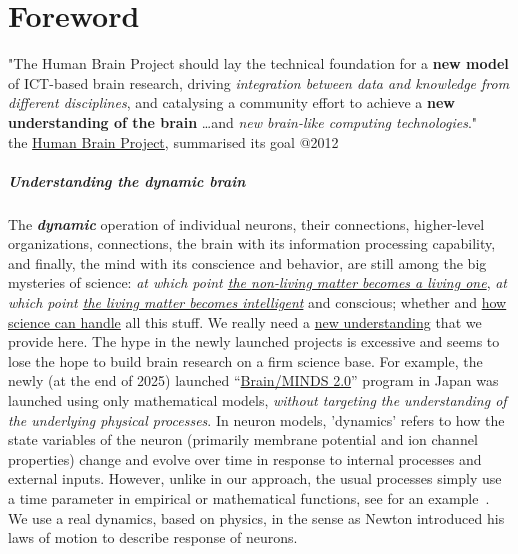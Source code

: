 
\chapter*{Foreword\label{ch:Foreword}}


\quotationbox
{"The Human Brain Project should lay the technical foundation for a \textbf{new model} of ICT-based brain research, driving \textit{integration between data and knowledge from different disciplines}, and catalysing a community effort to achieve a \textbf{new understanding of the brain}%
\dots and \textit{new brain-like computing technologies}."\\
{the \href{https://www.humanbrainproject.eu/en/}{Human Brain Project},  summarised its goal @2012}}


\paragraph*{Understanding the dynamic brain}
The \textbf{\textit{dynamic}} operation of individual neurons, their connections, higher-level organizations, connections,
the brain with its information processing capability, and finally, the mind with its conscience and behavior,
are still among the big mysteries of science: \textit{at which point
\hyperlink{LivingMatter}
{the non-living matter becomes a living one}}, \textit{at which point \hyperlink{CognitiveMatter}{the living matter becomes intelligent}} and conscious; whether and \hyperlink{PhysicalPictureNeuron}{how science can handle} all this stuff. 
We really need a \hyperlink{NewUnderstanding}
{new understanding} that we provide here.
%
The hype in the newly launched projects is excessive and seems to lose the hope 
to build brain research on a firm science base.
For example, the newly (at the end of 2025) launched “\href{https://brainminds.jp/en}{Brain/MINDS 2.0}” program in Japan was launched 
using only mathematical models, \textit{without targeting the understanding of the underlying physical processes}.
In neuron models, 'dynamics' refers to how the state variables of the neuron (primarily membrane potential and ion channel properties) change and evolve over time in response to internal processes and external inputs. However, unlike in our approach, the usual processes simply use a time parameter in empirical or mathematical functions, see for an example~\cite{NeuralDynamicsGertsner:2014}. We use a real dynamics,
based on physics, in the sense as Newton introduced his laws of motion to describe
response of neurons.



